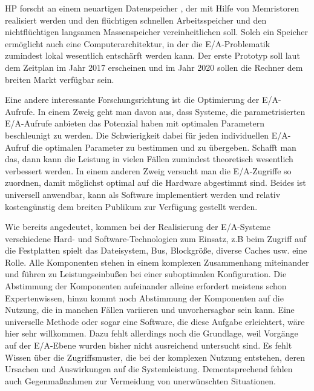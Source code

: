 HP forscht an einem neuartigen Datenspeicher \cite{hp_memristor_future}, der mit Hilfe von Memristoren realisiert werden und den flüchtigen schnellen Arbeitsspeicher und den nichtflüchtigen langsamen Massenspeicher vereinheitlichen soll. Solch ein Speicher ermöglicht auch eine Computerarchitektur, in der die E/A-Problematik zumindest lokal wesentlich entschärft werden kann. Der erste Prototyp soll laut dem Zeitplan im Jahr 2017 erscheinen und im Jahr 2020 sollen die Rechner dem breiten Markt verfügbar sein. 

Eine andere interessante Forschungsrichtung ist die Optimierung der E/A-Aufrufe. In einem Zweig geht man davon aus, dass Systeme, die parametrisierten E/A-Aufrufe anbieten das Potenzial haben mit optimalen Parametern beschleunigt zu werden. Die Schwierigkeit dabei für jeden individuellen E/A-Aufruf die optimalen Parameter zu bestimmen und zu übergeben. Schafft man das, dann kann die Leistung in vielen Fällen zumindest theoretisch wesentlich verbessert werden. In einem anderen Zweig versucht man die E/A-Zugriffe so zuordnen, damit möglichst optimal auf die Hardware abgestimmt sind. Beides ist universell anwendbar, kann als Software implementiert werden und relativ kostengünstig dem breiten Publikum zur Verfügung gestellt werden.

Wie bereits angedeutet, kommen bei der Realisierung der E/A-Systeme verschiedene Hard- und Software-Technologien zum Einsatz, z.B beim Zugriff auf die Festplatten spielt das Dateisystem, Bus, Blockgröße, diverse Caches usw. eine Rolle. Alle Komponenten stehen in einem komplexen Zusammenhang miteinander und führen zu Leistungseinbußen bei einer suboptimalen Konfiguration. Die Abstimmung der Komponenten aufeinander alleine erfordert meistens schon Expertenwissen, hinzu kommt noch Abstimmung der Komponenten auf die Nutzung, die in manchen Fällen variieren und unvorhersagbar sein kann. Eine universelle Methode oder sogar eine Software, die diese Aufgabe erleichtert, wäre hier sehr willkommen. Dazu fehlt allerdings noch die Grundlage, weil Vorgänge auf der E/A-Ebene wurden bisher nicht ausreichend untersucht sind. Es fehlt Wissen über die Zugriffsmuster, die bei der komplexen Nutzung entstehen, deren Ursachen und Auswirkungen auf die Systemleistung. Dementsprechend fehlen auch 
Gegenmaßnahmen zur Vermeidung von unerwünschten Situationen.

